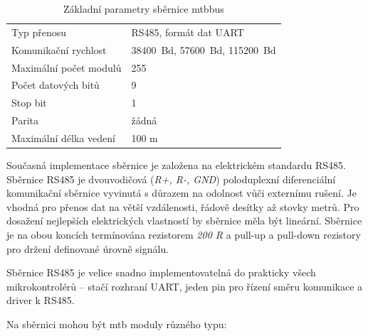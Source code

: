 \begin{table}[h]
	\begin{tabularx}{\textwidth}{XX}
		\toprule
		Typ přenosu & RS485, formát dat UART \\
		Komunikační rychlost & 38400~Bd, 57600~Bd, 115200~Bd \\
		Maximální počet modulů & 255 \\
		Počet datových bitů & 9 \\
		Stop bit & 1 \\
		Parita & žádná \\
		Maximální délka vedení & 100 m \\
		\bottomrule
	\end{tabularx}
	\caption{Základní parametry sběrnice \gls{mtbbus}}
	\label{tab:mtbbus-params}
\end{table}

Současná implementace sběrnice je založena na elektrickém standardu RS485.
Sběrnice RS485 je dvouvodičová (\textit{R+, R-, GND}) poloduplexní
diferenciální komunikační sběrnice vyvinutá s důrazem na odolnost vůči
externímu rušení. Je vhodná pro přenos dat na větší vzdálenosti, řádově desítky
až stovky metrů. Pro dosažení nejlepších elektrických vlastností by sběrnice
měla být lineární. Sběrnice je na obou koncích termínována rezistorem
\textit{200 R} a pull-up a pull-down rezistory pro držení definované úrovně
signálu.

Sběrnice RS485 je velice snadno implementovatelná do prakticky všech
mikrokontrolérů – stačí rozhraní UART, jeden pin pro řízení směru komunikace
a driver k RS485.

Na sběrnici mohou být \gls{mtb} moduly různého typu:

